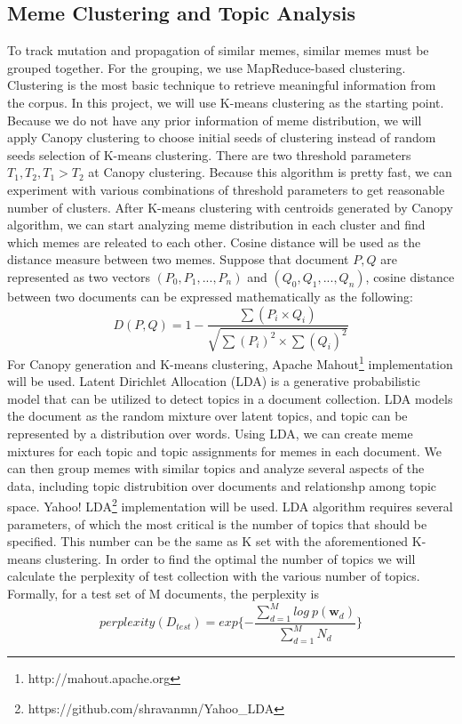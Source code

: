 \documentclass{sig-alternate}
\begin{document}
\subsection{Meme Clustering and Topic Analysis}
To track mutation and propagation of similar memes, similar memes must be grouped together. For the grouping, we use MapReduce-based clustering. Clustering is the most basic technique to retrieve meaningful information from the corpus. In this project, we will use K-means clustering as the starting point. Because we do not have any prior information of meme distribution, we will apply Canopy clustering \cite{McCallum2000} to choose initial seeds of clustering instead of random seeds selection of K-means clustering. There are two threshold parameters $T_1,T_2,T_1>T_2$ at Canopy clustering. Because this algorithm is pretty fast, we can experiment with various combinations of threshold parameters to get reasonable number of clusters. After K-means clustering with centroids generated by Canopy algorithm, we can start analyzing meme distribution in each cluster and find which memes are releated to each other.
Cosine distance will be used as the distance measure between two memes. Suppose that document $P,Q$ are represented as two vectors $(P_0, P_1,...,P_n)$ and $(Q_0, Q_1,...,Q_n)$, cosine distance between two documents can be expressed mathematically as the following:
\begin{displaymath}
D(P,Q)=1-\frac{\sum(P_i \times Q_i)}{\sqrt{\sum{(P_i)^2} \times \sum{(Q_i)^2}}}
\end{displaymath}
For Canopy generation and K-means clustering, Apache Mahout\footnote{http://mahout.apache.org} implementation will be used. 
Latent Dirichlet Allocation (LDA)\cite{Blei2003} is a generative probabilistic model that can be utilized to detect topics in a document collection. LDA models the document as the random mixture over latent topics, and topic can be represented by a distribution over words. Using LDA, we can create meme mixtures for each topic and topic assignments for memes in each document. We can then group memes with similar topics and analyze several aspects of the data, including topic distrubition over documents and relationshp among topic space. Yahoo! LDA\footnote{https://github.com/shravanmn/Yahoo\_LDA}  implementation will be used. LDA algorithm requires several parameters, of which the most critical is the number of topics that should be specified. This number can be the same as K set with the aforementioned K-means clustering. In order to find the optimal the number of topics we will calculate the perplexity of test collection with the various number of topics. Formally, for a test set of M documents, the perplexity is
\begin{displaymath}
 perplexity(D_{test})=exp\{-\frac{\sum_{d=1}^M log\ p(\mathbf{w}_d)}{\sum_{d=1}^M N_d}\}
\end{displaymath}
\end{document}
